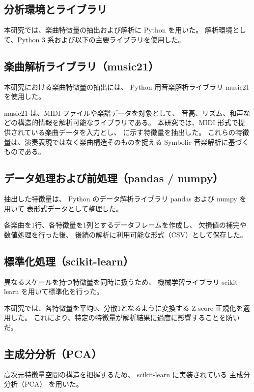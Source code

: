 \subsection{分析環境とライブラリ}
本研究では、楽曲特徴量の抽出および解析に Python を用いた。
解析環境として、Python 3 系および以下の主要ライブラリを使用した。

\subsection{楽曲解析ライブラリ（music21）}

本研究における楽曲特徴量の抽出には、
Python 用音楽解析ライブラリ music21 を使用した。

music21 は、MIDI ファイルや楽譜データを対象として、
音高、リズム、和声などの構造的情報を解析可能なライブラリである。
本研究では、MIDI 形式で提供されている楽曲データを入力とし、
に示す特徴量を抽出した。
これらの特徴量は、演奏表現ではなく楽曲構造そのものを捉える
Symbolic 音楽解析に基づくものである。

\subsection{データ処理および前処理（pandas / numpy）}

抽出した特徴量は、
Python のデータ解析ライブラリ pandas および numpy を用いて
表形式データとして整理した。

各楽曲を1行、各特徴量を1列とするデータフレームを作成し、
欠損値の補完や数値処理を行った後、
後続の解析に利用可能な形式（CSV）として保存した。

\subsection{標準化処理（scikit-learn）}

異なるスケールを持つ特徴量を同時に扱うため、
機械学習ライブラリ scikit-learn を用いて標準化を行った。

本研究では、各特徴量を平均0、分散1となるように変換する
Z-score 正規化を適用した。
これにより、特定の特徴量が解析結果に過度に影響することを防いだ。

\subsection{主成分分析（PCA）}

高次元特徴量空間の構造を把握するため、
scikit-learn に実装されている 主成分分析（PCA） を用いた。

